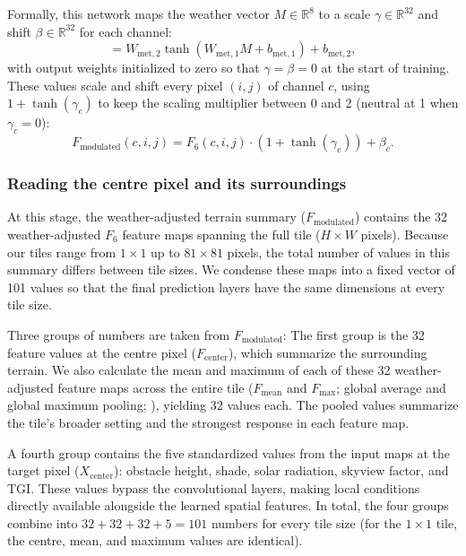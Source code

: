 \documentclass[12pt]{article}
\begin{document}
\noindent Formally, this network maps the weather vector $M \in \mathbb{R}^8$ to a scale $\gamma \in \mathbb{R}^{32}$ and shift $\beta \in \mathbb{R}^{32}$ for each channel:
\begin{equation}
[\gamma, \beta] = W_{\text{met},2} \tanh\left(W_{\text{met},1} M + b_{\text{met},1}\right) + b_{\text{met},2},
\end{equation}
with output weights initialized to zero so that $\gamma = \beta = 0$ at the start of training. These values scale and shift every pixel $(i,j)$ of channel $c$, using $1 + \tanh(\gamma_c)$ to keep the scaling multiplier between 0 and 2 (neutral at 1 when $\gamma_c = 0$):
\begin{equation}
F_{\text{modulated}}(c, i, j) = F_6(c, i, j) \cdot \left(1 + \tanh(\gamma_c)\right) + \beta_c.
\end{equation}

\subsubsection{Reading the centre pixel and its surroundings}
\noindent At this stage, the weather-adjusted terrain summary ($F_{\text{modulated}}$) contains the 32 weather-adjusted $F_6$ feature maps spanning the full tile ($H \times W$ pixels). Because our tiles range from $1\times1$ up to $81\times81$ pixels, the total number of values in this summary differs between tile sizes. We condense these maps into a fixed vector of 101 values so that the final prediction layers have the same dimensions at every tile size.

Three groups of numbers are taken from $F_{\text{modulated}}$:
The first group is the 32 feature values at the centre pixel ($F_{\text{center}}$), which summarize the surrounding terrain. We also calculate the mean and maximum of each of these 32 weather-adjusted feature maps across the entire tile ($F_{\text{mean}}$ and $F_{\text{max}}$; global average and global maximum pooling; \citealt{lin_2014}), yielding 32 values each. The pooled values summarize the tile's broader setting and the strongest response in each feature map.

A fourth group contains the five standardized values from the input maps at the target pixel ($X_{\text{center}}$): obstacle height, shade, solar radiation, skyview factor, and TGI. These values bypass the convolutional layers, making local conditions directly available alongside the learned spatial features. In total, the four groups combine into $32 + 32 + 32 + 5 = 101$ numbers for every tile size (for the $1\times1$ tile, the centre, mean, and maximum values are identical).
\end{document}
